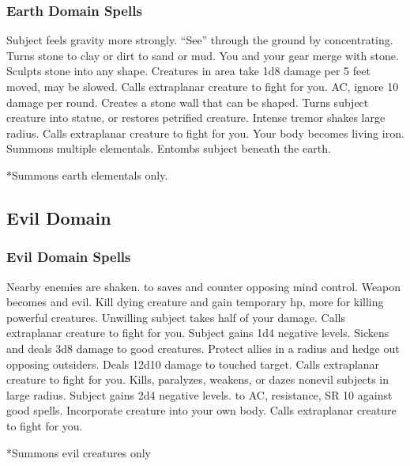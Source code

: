 \subsubsection{Earth Domain Spells}
\begin{spelllist}
 Subject feels gravity more strongly.
 ``See'' through the ground by concentrating.
\spellhead[2]{}
 Turns stone to clay or dirt to sand or mud.
 You and your gear merge with stone.
 Sculpts stone into any shape.
 Creatures in area take 1d8 damage per 5 feet moved, may be slowed.
 Calls extraplanar creature to fight for you.
  AC, ignore 10 damage per round.
 Creates a stone wall that can be shaped.
 Turns subject creature into statue, or restores petrified creature.
 Intense tremor shakes large radius.
 Calls extraplanar creature to fight for you.
 Your body becomes living iron.
\spellhead[8]{}
 Summons multiple elementals.
 Entombs subject beneath the earth.
\end{spelllist}
*Summons earth elementals only.

\subsection{Evil Domain}

\subsubsection{Evil Domain Spells}
\begin{spelllist}
 Nearby enemies are shaken.
  to saves and counter opposing mind control.
 Weapon becomes  and evil.
 Kill dying creature and gain temporary hp, more for killing powerful creatures.
 Unwilling subject takes half of your damage.
 Calls extraplanar creature to fight for you.
 Subject gains 1d4 negative levels.
 Sickens and deals 3d8 damage to good creatures.
\spellhead[5]{}
 Protect allies in a \areamed radius and hedge out opposing outsiders.
 Deals 12d10 damage to touched target.
 Calls extraplanar creature to fight for you.
 Kills, paralyzes, weakens, or dazes nonevil subjects in large radius.
\spellhead[7]{}
 Subject gains 2d4 negative levels.
\F {} to AC,  resistance, SR 10 against good spells.
 Incorporate creature into your own body.
 Calls extraplanar creature to fight for you.
\end{spelllist}
*Summons evil creatures only

